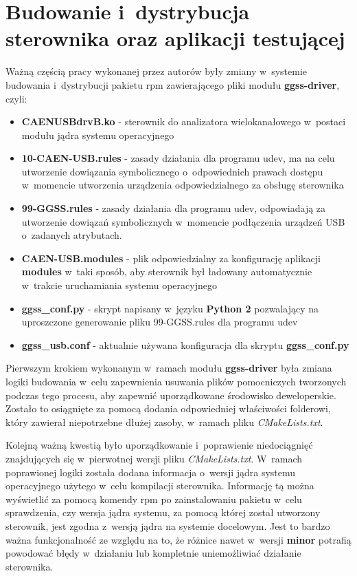 \newpage
\section{Budowanie i~dystrybucja sterownika oraz aplikacji testującej}
\label{section:driver}

Ważną częścią pracy wykonanej przez autorów były zmiany w~systemie budowania i~dystrybucji pakietu \gls*{rpm} zawierającego pliki modułu \textbf{ggss-driver}, czyli:
\begin{itemize}
\item \textbf{CAENUSBdrvB.ko} - sterownik do analizatora wielokanałowego w~postaci modułu jądra systemu operacyjnego
\item \textbf{10-CAEN-USB.rules} - zasady działania dla programu udev, ma na celu utworzenie dowiązania symbolicznego o~odpowiednich prawach dostępu w~momencie utworzenia urządzenia odpowiedzialnego za obsługę sterownika
\item \textbf{99-GGSS.rules} - zasady działania dla programu udev, odpowiadają za utworzenie dowiązań symbolicznych w~momencie podłączenia urządzeń USB o~zadanych atrybutach.
\item \textbf{CAEN-USB.modules} - plik odpowiedzialny za konfigurację aplikacji \textbf{modules} w~taki sposób, aby sterownik był ładowany automatycznie w~trakcie uruchamiania systemu operacyjnego
\item \textbf{ggss\_conf.py} - skrypt napisany w~języku \textbf{Python 2} pozwalający na uproszczone generowanie pliku 99-GGSS.rules dla programu udev
\item \textbf{ggss\_usb.conf} - aktualnie używana konfiguracja dla skryptu \textbf{ggss\_conf.py}
\end{itemize}

Pierwszym krokiem wykonanym w~ramach modułu \textbf{ggss-driver} była zmiana logiki budowania w~celu zapewnienia usuwania plików pomocniczych tworzonych podczas tego procesu, aby zapewnić uporządkowane środowisko deweloperskie. Zostało to osiągnięte za pomocą dodania odpowiedniej właściwości folderowi, który zawierał niepotrzebne dłużej zasoby, w~ramach pliku \textit{CMakeLists.txt}. \par
Kolejną ważną kwestią było uporządkowanie i~poprawienie niedociągnięć znajdujących się w~pierwotnej wersji pliku \textit{CMakeLists.txt}. W~ramach poprawionej logiki została dodana informacja o~wersji jądra systemu operacyjnego użytego w~celu kompilacji sterownika. Informację tą można wyświetlić za pomocą komendy \gls*{rpm} po zainstalowaniu pakietu w~celu sprawdzenia, czy wersja jądra systemu, za pomocą której został utworzony sterownik, jest zgodna z~wersją jądra na systemie docelowym. Jest to bardzo ważna funkcjonalność ze względu na to, że różnice nawet w~wersji \textbf{minor} potrafią powodować błędy w~działaniu lub kompletnie uniemożliwiać działanie sterownika.

